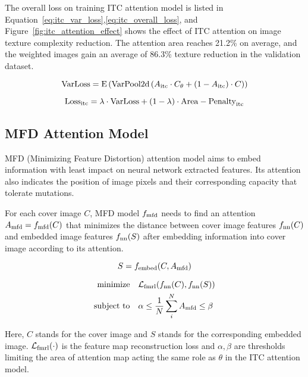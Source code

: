 \figureItcAttentionEffect%

The overall loss on training ITC attention model is listed in Equation~\ref{eq:itc_var_loss},\ref{eq:itc_overall_loss}, and Figure~\ref{fig:itc_attention_effect} shows the effect of ITC attention on image texture complexity reduction. The attention area reaches 21.2\% on average, and the weighted images gain an average of 86.3\% texture reduction in the validation dataset.

\begin{equation}
  \mathrm{VarLoss} = \mathrm{E} \left( \mathrm{VarPool2d} \left( A_{\text{itc}} \cdot C_{\theta} + (1 - A_{\text{itc}}) \cdot C \right) \right)
  \label{eq:itc_var_loss}
\end{equation}

\begin{equation}
  \mathrm{Loss}_{\text{itc}} = \lambda \cdot \text{VarLoss} + (1 - \lambda) \cdot \mathrm{Area-Penalty}_{\text{itc}}
  \label{eq:itc_overall_loss}
\end{equation}

\subsection{MFD Attention Model}
MFD (Minimizing Feature Distortion) attention model aims to embed information with least impact on neural network extracted features. Its attention also indicates the position of image pixels and their corresponding capacity that tolerate mutations.

For each cover image \(C\), MFD model \(f_{\text{mfd}}\) needs to find an attention \(A_{\text{mfd}} = f_{\text{mfd}}(C)\) that minimizes the distance between cover image features \(f_{\text{nn}}(C)\) and embedded image features \(f_{\text{nn}}(S)\) after embedding information into cover image according to its attention.

\begin{equation}
  S = f_{\text{embed}}(C, A_{\text{mfd}})
\end{equation}

\begin{align}
  \text{minimize}   \quad & \mathcal{L}_\mathrm{fmrl}(f_{\text{nn}}(C), f_{\text{nn}}(S)) \\
  \text{subject to} \quad & \alpha \leq \frac{1}{N} \sum_{i}^{N} A_{\text{mfd}} \leq \beta
\end{align}

Here, \(C\) stands for the cover image and \(S\) stands for the corresponding embedded image. \(\mathcal{L}_\mathrm{fmrl}(\cdot)\) is the feature map reconstruction loss and \( \alpha, \beta \) are thresholds limiting the area of attention map acting the same role as \( \theta \) in the ITC attention model.


